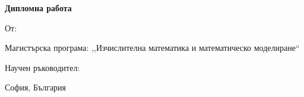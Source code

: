 \begin{titlepage}
    \thispagestyle{fancy}
    \begin{center}
        \hfill \break
        \hfill \break
        \hfill \break
        \Huge	
        \textbf{Дипломна работа}\\
        \@title
        \vspace{3cm}
    \end{center}
    \normalsize	
    \title{}
    \vspace{2cm}

    \begin{flushright}
        \normalsize	
        От: \@author
        
        Магистърска програма: ,,Изчислителна математика и математическо моделиране``
        \vspace{1cm}

        Научен ръководител:

        \VT
    \end{flushright}

    \vspace*{\fill}
    \begin{center}
        \footnotesize	
        София, България\\
         ~\@date~
    \end{center}
 \end{titlepage}